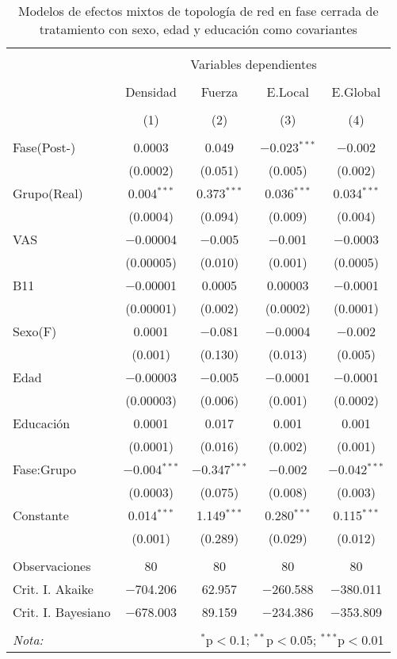\begin{table}[!t] \centering
  \caption{Modelos de efectos mixtos de topología de red en fase cerrada de tratamiento con sexo, edad y educación como covariantes}
  \label{tab:memT1}
\begin{tabular}{@{\extracolsep{5pt}}lcccc}
\\[-1.8ex]\hline
\hline \\[-1.8ex]
 & \multicolumn{4}{c}{Variables dependientes} \\
\cline{2-5}
\\[-1.8ex] & Densidad & Fuerza & E.Local & E.Global \\
\\[-1.8ex] & (1) & (2) & (3) & (4)\\
\hline \\[-1.8ex]
 Fase(Post-) & 0.0003 & 0.049 & $-$0.023$^{***}$ & $-$0.002 \\
  & (0.0002) & (0.051) & (0.005) & (0.002) \\
  Grupo(Real) & 0.004$^{***}$ & 0.373$^{***}$ & 0.036$^{***}$ & 0.034$^{***}$ \\
  & (0.0004) & (0.094) & (0.009) & (0.004) \\
  VAS & $-$0.00004 & $-$0.005 & $-$0.001 & $-$0.0003 \\
  & (0.00005) & (0.010) & (0.001) & (0.0005) \\
  B11 & $-$0.00001 & 0.0005 & 0.00003 & $-$0.0001 \\
  & (0.00001) & (0.002) & (0.0002) & (0.0001) \\
  Sexo(F) & 0.0001 & $-$0.081 & $-$0.0004 & $-$0.002 \\
  & (0.001) & (0.130) & (0.013) & (0.005) \\
  Edad & $-$0.00003 & $-$0.005 & $-$0.0001 & $-$0.0001 \\
  & (0.00003) & (0.006) & (0.001) & (0.0002) \\
  Educación & 0.0001 & 0.017 & 0.001 & 0.001 \\
  & (0.0001) & (0.016) & (0.002) & (0.001) \\
  Fase:Grupo & $-$0.004$^{***}$ & $-$0.347$^{***}$ & $-$0.002 & $-$0.042$^{***}$ \\
  & (0.0003) & (0.075) & (0.008) & (0.003) \\
  Constante & 0.014$^{***}$ & 1.149$^{***}$ & 0.280$^{***}$ & 0.115$^{***}$ \\
  & (0.001) & (0.289) & (0.029) & (0.012) \\
 \hline \\[-1.8ex]
Observaciones & 80 & 80 & 80 & 80 \\
Crit. I. Akaike & $-$704.206 & 62.957 & $-$260.588 & $-$380.011 \\
Crit. I. Bayesiano & $-$678.003 & 89.159 & $-$234.386 & $-$353.809 \\
\hline
\hline \\[-1.8ex]
\textit{Nota:}  & \multicolumn{4}{r}{$^{*}$p$<$0.1; $^{**}$p$<$0.05; $^{***}$p$<$0.01} \\
\end{tabular}
\end{table}

